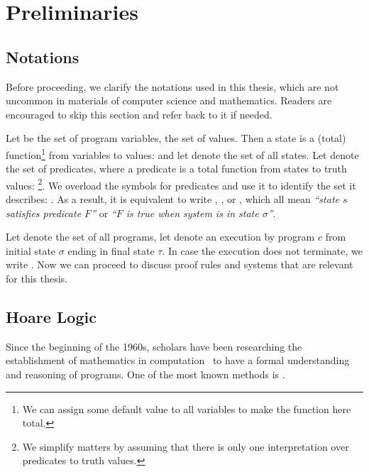 \chapter{Preliminaries}\label{ch:Preliminaries}
\setcounter{figure}{0}


\section{Notations}\label{sec:notation}
Before proceeding, we clarify the notations used in this thesis, which are not uncommon in materials of computer science and mathematics. 
Readers are encouraged to skip this section and refer back to it if needed. 

Let  be the set of program variables,  the set of values. 
Then a state is a (total) function\footnote{We can assign some default value to all variables to make the function here total. } from variables to values:  and let  denote the set of all states. 
Let  denote the set of predicates, where a predicate is a total function from states to truth values: 
\footnote{We simplify matters by assuming that there is only one interpretation over predicates to truth values. }. 
We overload the symbols for predicates and use it to identify the set it describes: . 
As a result, it is equivalent to write , , or , which all mean \textit{``state $s$ satisfies predicate $F$''} or \textit{``$F$ is true when system is in state $\sigma$''}. 

Let  denote the set of all programs, let  denote an execution by program $c$ from initial state $\sigma$ ending in final state $\tau$. 
In case the execution does not terminate, we write . 
Now we can proceed to discuss proof rules and systems that are relevant for this thesis. 




\section{Hoare Logic}
Since the beginning of the 1960s, scholars have been researching the establishment of mathematics in computation~\cite{floyd93, mccarthy93} to have a formal understanding and reasoning of programs. 
One of the most known methods is . 

